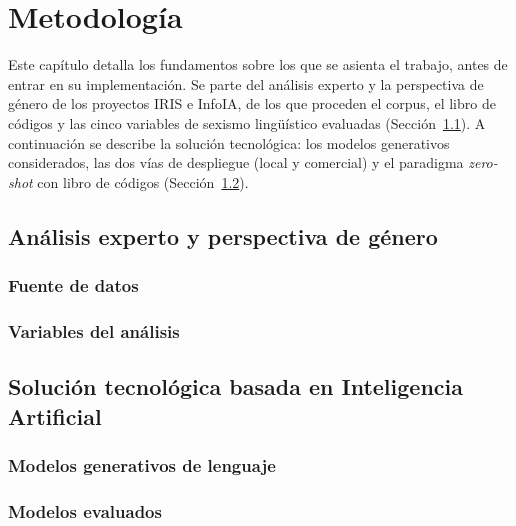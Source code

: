 \documentclass[12pt]{report} %
\renewcommand{\_}{\origunderscore\allowbreak}
\begin{document}

\chapter{Metodología}
\label{sec:methodology}
Este capítulo detalla los fundamentos sobre los que se asienta el trabajo, antes
de entrar en su implementación. Se parte del análisis experto y la perspectiva de
género de los proyectos IRIS e InfoIA, de los que proceden el corpus, el libro de códigos y las
cinco variables de sexismo lingüístico evaluadas
(Sección~\ref{sec:experts}). A continuación se describe la solución tecnológica:
los modelos generativos considerados, las dos vías de despliegue (local y
comercial) y el paradigma \textit{zero-shot} con libro de códigos
(Sección~\ref{sec:ai_solution}).


\section{Análisis experto y perspectiva de género}
\label{sec:experts}


\subsection{Fuente de datos}
\label{data_source}


\subsection{Variables del análisis}
\label{target_variables_defs}



\section{Solución tecnológica basada en Inteligencia Artificial}
\label{sec:ai_solution}


\subsection{Modelos generativos de lenguaje}
\label{sec:llms_models}


\subsection{Modelos evaluados}
\label{genai_models}

\end{document}
